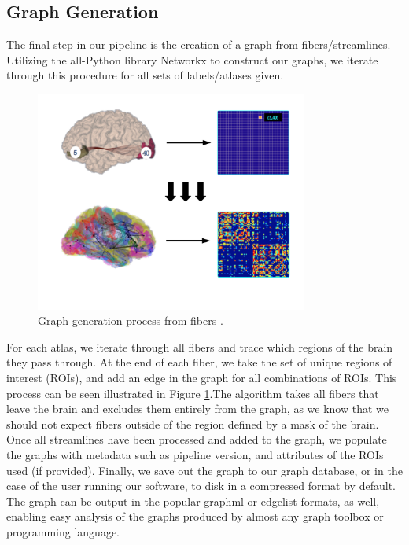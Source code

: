 \subsection{Graph Generation}
\label{sec:graph}
The final step in our pipeline is the creation of a graph from fibers/streamlines. Utilizing the all-Python library Networkx \cite{networkx} to construct our graphs, we iterate through this procedure for all sets of labels/atlases given.
\begin{figure}[h!]
\centering
\includegraphics[width=0.8\textwidth]{./figs/graphgen.png}
\makeatletter
\let\@currsize\normalsize
\caption{Graph generation process from fibers \cite{lattman2011}.}
\label{fig:graphgen}
\end{figure}

For each atlas, we iterate through all fibers and trace which regions of the brain they pass through. At the end of each fiber, we take the set of unique regions of interest (ROIs), and add an edge in the graph for all combinations of ROIs. This process can be seen illustrated in Figure \ref{fig:graphgen}.The algorithm takes all fibers that leave the brain and excludes them entirely from the graph, as we know that we should not expect fibers outside of the region defined by a mask of the brain. Once all streamlines have been processed and added to the graph, we populate the graphs with metadata such as pipeline version, and attributes of the ROIs used (if provided). Finally, we save out the graph to our graph database, or in the case of the user running our software, to disk in a compressed format by default. The graph can be output in the popular graphml or edgelist formats, as well, enabling easy analysis of the graphs produced by almost any graph toolbox or programming language.

